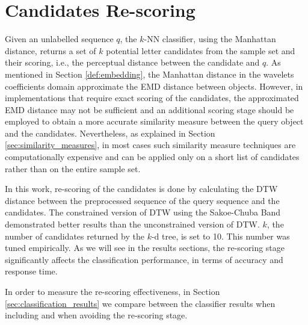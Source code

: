 \newpage{}

\section{Candidates Re-scoring}
\label{sec:candidates_scoring}
\iftoggle{edit-mode}{\hspace{0pt}\marginpar{The need for a re-scoring}}{} 
Given an unlabelled sequence $q$, the $k$-NN classifier, using the Manhattan distance, returns a set of $k$ potential letter candidates from the sample set and their scoring, i.e., the perceptual distance between the candidate and $q$.
As mentioned in Section \ref{def:embedding}, the Manhattan distance in the wavelets coefficients domain approximate the EMD distance between objects. 
However, in implementations that require exact scoring of the candidates, the approximated EMD distance may not be sufficient and an additional scoring stage should be employed to obtain a more accurate similarity measure between the query object and the candidates.
Nevertheless, as explained in Section \ref{sec:similarity_measures}, in most cases such similarity measure techniques are computationally expensive and can be applied only on a short list of candidates rather than on the entire sample set.   

\iftoggle{edit-mode}{\hspace{0pt}\marginpar{How re-scoring is done here}}{} 
In this work, re-scoring of the candidates is done by calculating the DTW distance between the preprocessed sequence of the query sequence and the candidates.
The constrained version of DTW using the Sakoe-Chuba Band \cite{sakoe1978dynamic} demonstrated better results than the unconstrained version of DTW.
$k$, the number of candidates returned by the $k$-d tree, is set to 10.
This number was tuned empirically.
As we will see in the results sections, the re-scoring stage significantly affects the classification performance, in terms of accuracy and response time.

\iftoggle{edit-mode}{\hspace{0pt}\marginpar{Re-scoring Effectiveness}}{} 
In order to measure the re-scoring effectiveness, in Section \ref{sec:classification_results} we compare between the classifier results when including and when avoiding the re-scoring stage.

\newpage{}

